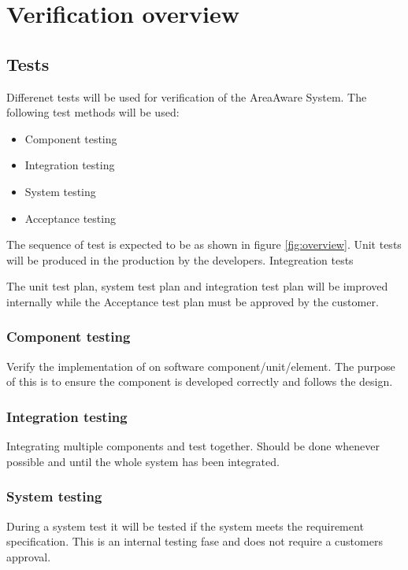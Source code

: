 \label{chp:testOverview}
\chapter{Verification overview}


\section{Tests}
Differenet tests will be used for verification of the AreaAware System. The following test methods will be used:

\begin{itemize}
	\item Component testing
	\item Integration testing
	\item System testing
	\item Acceptance testing



\end{itemize}

The sequence of test is expected to be as shown in figure \ref{fig:overview}. Unit tests will be produced in the production by the developers. Integreation tests



The unit test plan, system test plan and integration test plan will be improved internally while the Acceptance test plan must be approved by the customer. 

\subsection{Component testing}
Verify the implementation of on software component/unit/element. The purpose of this is to ensure the component is developed correctly and follows the design. 

\subsection{Integration testing}
Integrating multiple components and test together. Should be done whenever possible and until the whole system has been integrated. 

\subsection{System testing}
During a system test it will be tested if the system meets the requirement specification. This is an internal testing fase and does not require a customers approval. 

